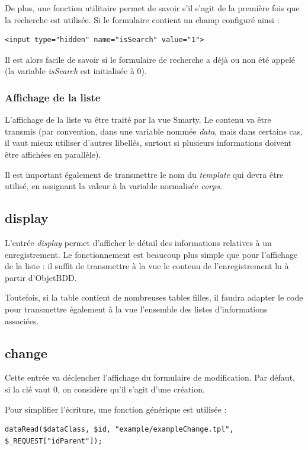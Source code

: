 {De plus, une fonction utilitaire permet de savoir s'il s'agit de la première fois que la recherche est utilisée. Si le formulaire contient un champ configuré ainsi :
\begin{lstlisting}
<input type="hidden" name="isSearch" value="1">
\end{lstlisting}
Il est alors facile de savoir si le formulaire de recherche a déjà ou non été appelé (la variable \textit{isSearch} est initialisée à 0).

\subsubsection{Affichage de la liste}
L'affichage de la liste va être traité par la vue Smarty. Le contenu va être transmis (par convention, dans une variable nommée \textit{data}, mais dans certains cas, il vaut mieux utiliser d'autres libellés, surtout si plusieurs informations doivent être affichées en parallèle).

Il est important également de transmettre le nom du \textit{template} qui devra être utilisé, en assignant la valeur à la variable normalisée \textit{corps}.

\subsection{display}

L'entrée \textit{display} permet d'afficher le détail des informations relatives à un enregistrement. Le fonctionnement est beaucoup plus simple que pour l'affichage de la liste : il suffit de transmettre à la vue le contenu de l'enregistrement lu à partir d'ObjetBDD.

Toutefois, si la table contient de nombreuses tables filles, il faudra adapter le code pour transmettre également à la vue l'ensemble des listes d'informations associées.

\subsection{change}

Cette entrée va déclencher l'affichage du formulaire de modification. Par défaut, si la clé vaut 0, on considère qu'il s'agit d'une création.

Pour simplifier l'écriture, une fonction générique est utilisée : 

\begin{lstlisting}
dataRead($dataClass, $id, "example/exampleChange.tpl", $_REQUEST["idParent"]);
\end{lstlisting}

}
